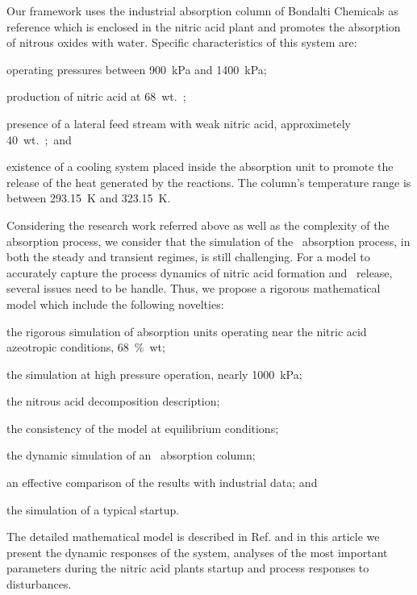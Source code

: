 \documentclass[journal=jacsat,manuscript=article]{achemso}
\newcommand{\nox}{\ce{NO_{\rmfamily{x}}}}
\begin{document}
Our framework uses the
industrial absorption column of Bondalti Chemicals as reference which is enclosed in the nitric acid
plant and promotes the absorption of nitrous oxides with water. 
Specific characteristics of this system are:
\begin{inparaenum}[(i)]
	\item operating pressures between \SI{900}{\kilo\pascal} and \SI{1400}{\kilo\pascal};
	\item production of nitric acid at \SI{68}{\percent wt.}; 
	\item presence of a lateral feed stream with weak nitric acid, approximetely \SI{40}{\percent wt.}; and
	\item existence of a cooling system placed inside the absorption unit to
	promote the release of the heat generated by the
	reactions. The column's temperature range is between \SI{293.15}{\kelvin} and \SI{323.15}{\kelvin}.
\end{inparaenum}

Considering the research work referred above as well as the complexity of the absorption process, we consider that the simulation of the \nox~absorption process, in both the steady and transient regimes, is still challenging. For a model to accurately capture the process dynamics of nitric acid formation and \nox~release, several issues need to be handle. 
Thus, we propose a rigorous mathematical model which include the following novelties:
\begin{inparaenum}[(i)]
	\item the rigorous simulation of absorption units operating near the nitric acid azeotropic conditions, \SI{68}{\percent~wt};
	\item the simulation at high pressure operation, nearly \SI{1000}{\kilo\pascal};
	\item the nitrous acid decomposition description;
	\item the consistency of the model at equilibrium conditions;
	\item the dynamic simulation of an \nox~absorption column;
	\item an effective comparison of the results with industrial data; and
	\item the simulation of a typical startup.
\end{inparaenum}
The detailed mathematical model is described in Ref.  and in this article we present the dynamic responses of the system, analyses of the most important parameters during the nitric acid plants startup and process responses to disturbances.
\end{document}
